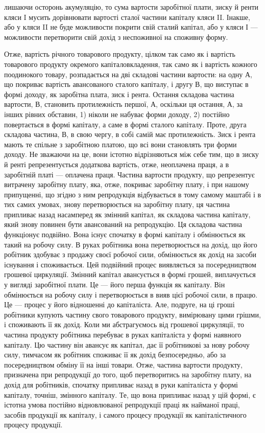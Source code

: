 \parcont{}  %
лишаючи осторонь акумуляцію, то сума вартости заробітної плати, зиску й ренти
кляси I мусить дорівнювати вартості сталої частини капіталу кляси II. Інакше,
або у кляси II не буде можливости покрити свій сталий капітал, або у кляси І —
можливости перетворити свій дохід з неспоживної на споживну форму.

Отже, вартість річного товарового продукту, цілком так само як і вартість
товарового продукту окремого капіталовкладення, так само як і вартість кожного
поодинокого товару, розпадається на дві складові частини вартости: на одну А, що
покриває вартість авансованого сталого капіталу, і другу В, що виступає в формі
доходу, як заробітна плата, зиск і рента. Остання складова частина вартости, В,
становить протилежність першої, А, оскільки ця остання, А, за інших рівних
обставин, 1) ніколи не набуває форми доходу, 2) постійно повертається в формі
капіталу, а саме в формі сталого капіталу. Проте, друга складова частина, В,
в свою чергу, в собі самій має протилежність. Зиск і рента мають те спільне з заробітною
платою, що всі вони становлять три форми доходу. Не зважаючи на це,
вони істотно відрізняються між себе тим, що в зиску й ренті репрезентується
додаткова вартість, отже, неоплачена праця, а в заробітній платі — оплачена
праця. Частина вартости продукту, що репрезентує витрачену заробітну плату,
яка, отже, покриває заробітну плату, і при нашому припущенні, що згідно з ним
репродукція відбувається в тому самому маштабі і в тих самих умовах, знову
перетворюється на заробітну плату, ця частина припливає назад насамперед
як змінний капітал, як складова частина капіталу, який знову повинен бути
авансований на репродукцію. Ця складова частина функціонує подвійно. Вона
існує спочатку в формі капіталу і обмінюється як такий на робочу силу. В руках
робітника вона перетворюється на дохід, що його робітник здобуває з продажу
своєї робочої сили, обмінюється як дохід на засоби існування і споживається.
Цей подвійний процес виявляється за посередництвом грошевої циркуляції. Змінний
капітал авансується в формі грошей, виплачується у вигляді заробітної плати.
Це — його перша функція як капіталу. Він обмінюється на робочу силу і перетворюється
в вияв цієї робочої сили, в працю. Це — процес у його відношенні до
капіталіста. Але, подруге, на ці гроші робітники купують частину свого товарового
продукту, вимірювану цими грішми, і споживають її як дохід. Коли ми
абстрагуємось від грошевої циркуляції, то частина продукту робітника перебуває
в руках капіталіста у формі наявного капіталу. Цю частину він авансує як
капітал, дає її робітникові за нову робочу силу, тимчасом як робітник споживає
її як дохід безпосередньо, або за посередництвом обміну її на інші товари.
Отже, частина вартости продукту, призначена при репродукції до того, щоб перетворитись
на заробітну плату, на дохід для робітників, спочатку припливає
назад в руки капіталіста у формі капіталу, точніш, змінного капіталу. Те, що
вона припливає назад у цій формі, є істотна умова постійно відновлюваної
репродукції праці як найманої праці, засобів продукції як капіталу, і самого
процесу продукції як капіталістичного процесу продукції.

